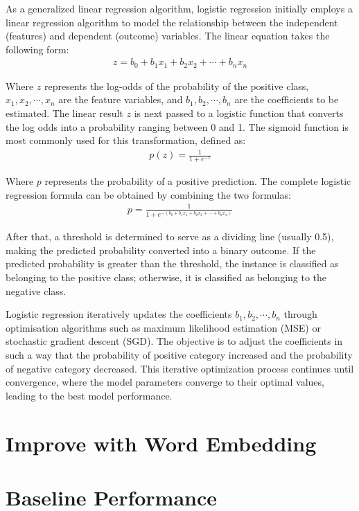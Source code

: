 \documentclass[ %
                    author={Louis Wang},
                supervisor={Dr. Qiang Liu},
                    degree={MSc},
                     title={Identification of Suicide Ideation in Texts},
                      type={},
                      year={2024}]{dissertation}
\begin{document}
As a generalized linear regression algorithm, logistic regression initially employs a linear regression algorithm to model the relationship between the independent (features) and dependent (outcome) variables. The linear equation takes the following form:
\begin{eqnarray}
      z=b_0+b_1x_1+b_2x_2+\cdots+b_nx_n
\end{eqnarray}

Where $z$ represents the log-odds of the probability of the positive class, $x_1,x_2,\cdots,x_n$ are the feature variables, and $b_1,b_2,\cdots,b_n$ are the coefficients to be estimated. The linear result $z$ is next passed to a logistic function that converts the log odds into a probability ranging between 0 and 1. The sigmoid function is most commonly used for this transformation, defined as:
\begin{eqnarray}
      p(z)=\frac{1}{1 + e^{-z}}
\end{eqnarray}

Where $p$ represents the probability of a positive prediction. The complete logistic regression formula can be obtained by combining the two formulas:
\begin{eqnarray}
      p=\frac{1}{1 + e^{-(b_0+b_1x_1+b_2x_2+\cdots+b_nx_n)}}
\end{eqnarray}

After that, a threshold is determined to serve as a dividing line (usually 0.5), making the predicted probability converted into a binary outcome. If the predicted probability is greater than the threshold, the instance is classified as belonging to the positive class; otherwise, it is classified as belonging to the negative class.

Logistic regression iteratively updates the coefficients $b_1,b_2,\cdots,b_n$ through optimisation algorithms such as maximum likelihood estimation (MSE) or stochastic gradient descent (SGD). The objective is to adjust the coefficients in such a way that the probability of positive category increased and the probability of negative category decreased. This iterative optimization process continues until convergence, where the model parameters converge to their optimal values, leading to the best model performance.

\section{Improve with Word Embedding}

\section{Baseline Performance}
\end{document}
